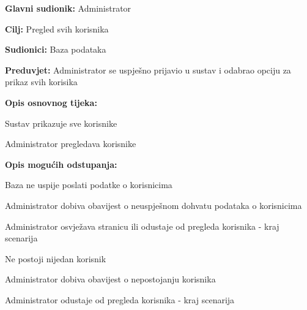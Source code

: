 					\eject
					\noindent {}
					\begin{packed_item}
	
						\item \textbf{Glavni sudionik: }Administrator
						\item  \textbf{Cilj:} Pregled svih korisnika
						\item  \textbf{Sudionici:} Baza podataka
						\item  \textbf{Preduvjet:} Administrator se uspješno prijavio u sustav i odabrao opciju za prikaz svih korisika
						\item  \textbf{Opis osnovnog tijeka:}
						
						\item[] \begin{packed_enum}
							\item Sustav prikazuje sve korisnike
							\item Administrator pregledava korisnike
						\end{packed_enum}
						\item  \textbf{Opis mogućih odstupanja:}

						\item[] \begin{packed_item}
							\item[1.a] Baza ne uspije poslati podatke o korisnicima
							\item[] \begin{packed_enum}
								
								\item Administrator dobiva obavijest o neuspješnom dohvatu podataka o korisnicima
								\item Administrator osvježava stranicu ili odustaje od pregleda korisnika - kraj scenarija
							
							\end{packed_enum}	
							\item[1.b] Ne postoji nijedan korisnik
							\item[] \begin{packed_enum}
								
								\item Administrator dobiva obavijest o nepostojanju korisnika
								\item Administrator odustaje od pregleda korisnika - kraj scenarija
							
							\end{packed_enum}
						\end{packed_item}	
					\end{packed_item}
					
